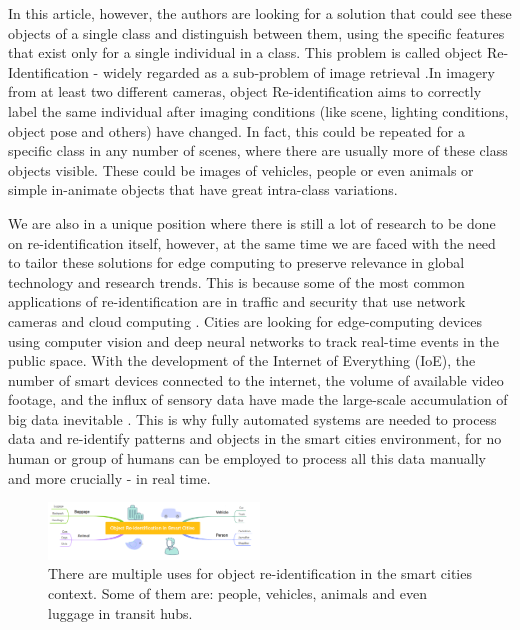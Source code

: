 \documentclass[conference]{IEEEtran} %
\begin{document}
 In this article, however, the authors are looking for a solution that could see these objects of a single class and distinguish between them, using the specific features that exist only for a single individual in a class.
 This problem is called object Re-Identification - widely regarded as a sub-problem of image retrieval \cite{li2019object}.In imagery from at least two different cameras, object Re-identification aims to correctly label the same individual after imaging conditions (like scene, lighting conditions, object pose and others) have changed. In fact, this could be repeated for a specific class in any number of scenes, where there are usually more of these class objects visible. These could be images of vehicles, people or even animals or simple in-animate objects that have great intra-class variations.
 
 We are also in a unique position where there is still a lot of research to be done on re-identification itself, however, at the same time we are faced with the need to tailor these solutions for edge computing to preserve relevance in global technology and research trends. This is because some of the most common applications of re-identification are in traffic and security that use network cameras and cloud computing \cite{barthelemy2019edge} \cite{wang2024efficient}.
 Cities are looking for edge-computing devices using computer vision and deep neural networks to track real-time events in the public space. With the development of the Internet of Everything (IoE), the number of smart devices connected to the internet, the volume of available video footage, and the influx of sensory data have made the large-scale accumulation of big data inevitable \cite{cao2020overview}. This is why fully automated systems are needed to process data and re-identify patterns and objects in the smart cities environment, for no human or group of humans can be employed to process all this data manually and more crucially - in real time.
 
 \begin{figure}[b]
 	\centering
 	\includegraphics[width=0.5\textwidth]{re_id_diagramma_1.png} %
 	\caption{There are multiple uses for object re-identification in the smart cities context. Some of them are: people, vehicles, animals and even luggage in transit hubs.}
 	\label{fig:fig1} %
 \end{figure}
 
\end{document}
